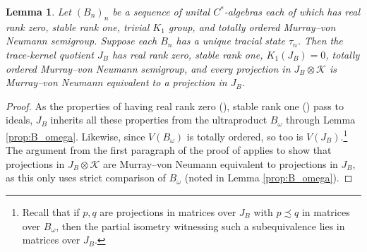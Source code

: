 \documentclass[reqno]{amsart}
\newtheorem{lem}[thm]{Lemma}
\theoremstyle{definition}
\theoremstyle{remark}
\numberwithin{equation}{section}
\theoremstyle{definition}
\begin{document}
\begin{lem}
 Let $(B_n)_{n}$ be a sequence of unital $C^*$-algebras each of which has real rank zero, stable rank one, trivial $K_1$ group, and totally ordered Murray--von Neumann semigroup. Suppose each $B_n$ has a unique tracial state $\tau_n$. Then the trace-kernel quotient $J_B$ has real rank zero, stable rank one, $K_1(J_B)=0$, totally ordered Murray--von Neumann semigroup, and every projection in $J_B\otimes\mathcal K$ is Murray--von Neumann equivalent to a projection in $J_B$. 
\end{lem}

\begin{proof}
As the properties of having real rank zero (\cite[Corollary 2.8]{BrownPedersen:JFA}), stable rank one (\cite[Theorem 4.3]{Rieffel-stablerank}) pass to ideals, $J_B$ inherits all these properties from the ultraproduct $B_\omega$ through Lemma \ref{prop:B_omega}. Likewise, since $V(B_\omega)$ is totally ordered, so too is $V(J_B)$.\footnote{Recall that if $p,q$ are projections in matrices over $J_B$ with $p\precsim q$ in matrices over $B_\omega$, then the partial isometry witnessing such a subequivalence lies in matrices over $J_B$.}  The argument from the first paragraph of the proof of \cite[Proposition 3.2(3)]{Schafhauser.Annals} applies to show that projections in $J_B\otimes\mathcal K$ are Murray--von Neumann equivalent to projections in $J_B$, as this only uses strict comparison of $B_\omega$ (noted in Lemma \ref{prop:B_omega}). 


\end{proof}
\end{document}
